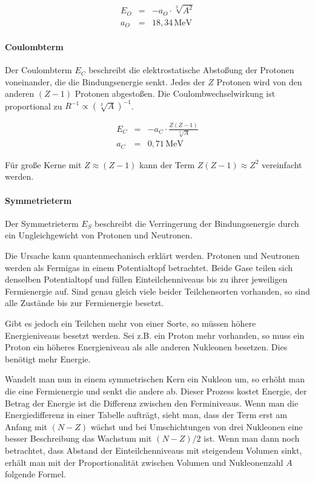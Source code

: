 \documentclass[12pt,a4paper]{scrartcl}
\numberwithin{equation}{section} %
\begin{document}
\begin{eqnarray}
	E_O &=& - a_O\cdot \sqrt[3]{A^2} \label{Oberflächenterm} \\
	a_O &=& 18,34\mathrm{\,MeV}
\end{eqnarray}

\hypertarget{coulombterm}{%
	\paragraph{Coulombterm}\label{coulombterm}}

Der Coulombterm $E_C$ beschreibt die elektrostatische Abstoßung der Protonen voneinander, die die Bindungsenergie senkt. Jedes der $Z$ Protonen wird von den anderen $(Z-1)$ Protonen abgestoßen. Die Coulombwechselwirkung ist proportional zu $R^{-1}\propto\left(\sqrt[3]{A}\right)^{-1}$.

\begin{eqnarray}
	E_C &=& - a_C\cdot \frac{Z(Z-1)}{\sqrt[3]{A}} \label{Coulombterm} \\
	a_C &=& 0,71\mathrm{\,MeV}
\end{eqnarray}

\noindent
Für große Kerne mit $Z\approx(Z-1)$ kann der Term $Z(Z-1)\approx Z^2$ vereinfacht werden.

\hypertarget{symmetrieterm}{%
	\paragraph{Symmetrieterm}\label{symmetrieterm}}

Der Symmetrieterm $E_S$ beschreibt die Verringerung der Bindungsenergie durch ein Ungleichgewicht von Protonen und Neutronen.

Die Ursache kann quantenmechanisch erklärt werden. Protonen und Neutronen werden als Fermigas in einem Potentialtopf betrachtet. Beide Gase teilen sich denselben Potentialtopf und füllen Einteilchenniveaus bis zu ihrer jeweiligen Fermienergie auf. Sind genau gleich viele beider Teilchensorten vorhanden, so sind alle Zustände bis zur Fermienergie besetzt.

Gibt es jedoch ein Teilchen mehr von einer Sorte, so müssen höhere Energieniveaus besetzt werden. Sei z.B. ein Proton mehr vorhanden, so muss ein Proton ein höheres Energieniveau als alle anderen Nukleonen besetzen. Dies benötigt mehr Energie.

Wandelt man nun in einem symmetrischen Kern ein Nukleon um, so erhöht man die eine Fermienergie und senkt die andere ab. Dieser Prozess kostet Energie, der Betrag der Energie ist die Differenz zwischen den Ferminiveaus. Wenn man die Energiedifferenz in einer Tabelle aufträgt, sieht man, dass der Term erst am Anfang mit $(N-Z)$ wächst und bei Umschichtungen von drei Nukleonen eine besser Beschreibung das Wachstum mit $(N-Z)/2$ ist. Wenn man dann noch betrachtet, dass Abstand der Einteilchenniveaus mit steigendem Volumen sinkt, erhält man mit der Proportionalität zwischen Volumen und Nukleonenzahl $A$ folgende Formel.
\end{document}
